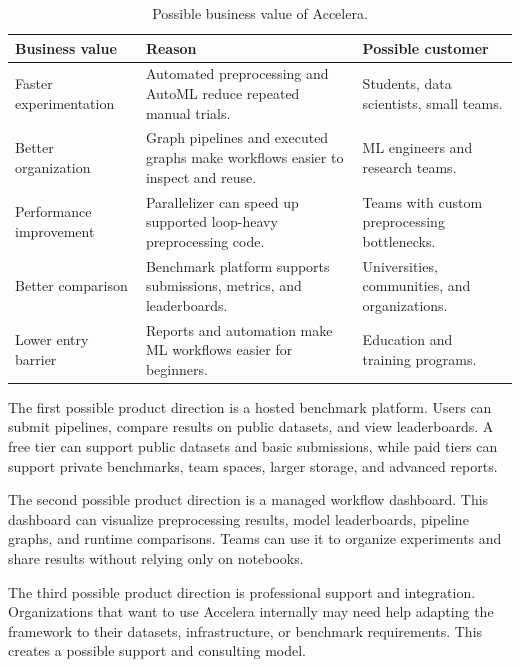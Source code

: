 \documentclass[12pt,a4paper]{report}
\begin{document}
\begin{table}[!htbp]
\centering
\caption{Possible business value of Accelera.}
\label{tab:business-value}
\small
\renewcommand{\arraystretch}{1.15}
\setlength{\tabcolsep}{4pt}
\begin{tabular}{p{}p{}p{}}
\toprule
Business value & Reason & Possible customer \\
\midrule
Faster experimentation &
Automated preprocessing and AutoML reduce repeated manual trials. &
Students, data scientists, small teams. \\

Better organization &
Graph pipelines and executed graphs make workflows easier to inspect and reuse. &
ML engineers and research teams. \\

Performance improvement &
Parallelizer can speed up supported loop-heavy preprocessing code. &
Teams with custom preprocessing bottlenecks. \\

Better comparison &
Benchmark platform supports submissions, metrics, and leaderboards. &
Universities, communities, and organizations. \\

Lower entry barrier &
Reports and automation make ML workflows easier for beginners. &
Education and training programs. \\
\bottomrule
\end{tabular}
\renewcommand{\arraystretch}{1.0}
\end{table}

The first possible product direction is a hosted benchmark platform. Users can
submit pipelines, compare results on public datasets, and view leaderboards. A
free tier can support public datasets and basic submissions, while paid tiers can
support private benchmarks, team spaces, larger storage, and advanced reports.

The second possible product direction is a managed workflow dashboard. This
dashboard can visualize preprocessing results, model leaderboards, pipeline
graphs, and runtime comparisons. Teams can use it to organize experiments and
share results without relying only on notebooks.

The third possible product direction is professional support and integration.
Organizations that want to use Accelera internally may need help adapting the
framework to their datasets, infrastructure, or benchmark requirements. This
creates a possible support and consulting model.
\end{document}
